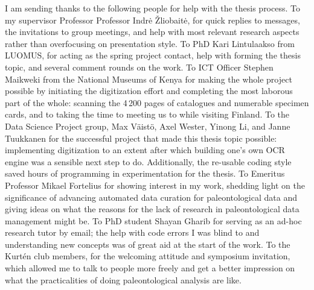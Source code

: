 \documentclass[english,twoside,openright]{UH_DS_MSc}
\begin{document}
I am sending thanks to the following people for help with the thesis process.
To my supervisor Professor Professor Indr{\.e} \v{Z}liobait{\.e}, for quick replies to messages, the invitations to group meetings, and help with most relevant research aspects rather than overfocusing on presentation style.
To PhD Kari Lintulaakso from LUOMUS, for acting as the spring project contact, help with forming the thesis topic, and several comment rounds on the work.
To ICT Officer Stephen Maikweki from the National Museums of Kenya for making the whole project possible by initiating the digitization effort and completing the most laborous part of the whole: scanning the 4\,200 pages of catalogues and numerable specimen cards, and to taking the time to meeting us to while visiting Finland.
To the Data Science Project group, Max V\"{a}ist\"{o}, Axel Wester, Yinong Li, and Janne Tuukkanen for the successful project that made this thesis topic possible: implementing digitization to an extent after which building one's own OCR engine was a sensible next step to do. Additionally, the re-usable coding style saved hours of programming in experimentation for the thesis.
To Emeritus Professor Mikael Fortelius for showing interest in my work, shedding light on the significance of advancing automated data curation for paleontological data and giving ideas on what the reasons for the lack of research in paleontological data management might be.
To PhD student Shayan Gharib for serving as an ad-hoc research tutor by email; the help with code errors I was blind to and understanding new concepts was of great aid at the start of the work.
To the Kurt\'{e}n club members, for the welcoming attitude and symposium invitation, which allowed me to talk to people more freely and get a better impression on what the practicalities of doing paleontological analysis are like.

\cleardoublepage %


\end{document}
